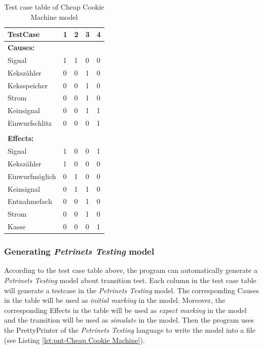 \begin{table}[]
    \centering
    \caption{Test case table of Cheap Cookie Machine model}
    \label{tab:test-case-table}
    \begin{tabular}{|p{3cm}|p{.5cm}<{\centering}|p{.5cm}<{\centering}|p{.5cm}<{\centering}|p{.5cm}<{\centering}|}
        \hline
        \rowcolor{gray} 
        \textbf{TestCase}   & 1  & 2  & 3  & 4  \\ \hline
        \multicolumn{5}{|l|}{\textbf{Causes:}}  \\ \hline
        Signal              & 1  & 1  & 0  & 0  \\ \hline
        Kekszähler          & 0  & 0  & 1  & 0  \\ \hline
        Keksspeicher        & 0  & 0  & 1  & 0  \\ \hline
        Strom               & 0  & 0  & 1  & 0  \\ \hline
        Keinsignal          & 0  & 0  & 1  & 1  \\ \hline
        Einwurfschlitz      & 0  & 0  & 0  & 1  \\ \hline
        \multicolumn{5}{|l|}{}                  \\ \hline
        \multicolumn{5}{|l|}{\textbf{Effects:}} \\ \hline
        Signal              & 1  & 0  & 0  & 1  \\ \hline
        Kekszähler          & 1  & 0  & 0  & 0  \\ \hline
        Einwurfmöglich      & 0  & 1  & 0  & 0  \\ \hline
        Keinsignal          & 0  & 1  & 1  & 0  \\ \hline
        Entnahmefach        & 0  & 0  & 1  & 0  \\ \hline
        Strom               & 0  & 0  & 1  & 0  \\ \hline
        Kasse               & 0  & 0  & 0  & 1  \\ \hline
    \end{tabular}
\end{table}

\subsubsection{Generating \emph{Petrinets Testing} model}
According to the test case table above, the program can automatically generate a \emph{Petrinets Testing} model about transition test. Each column in the test case table will generate a testcase in the \emph{Petrinets Testing} model. The corresponding Causes in the table will be used as \emph{initial marking} in the model. Moreover, the corresponding Effects in the table will be used as \emph{expect marking} in the model and the transition will be used as \emph{simulate} in the model. Then the program uses the PrettyPrinter of the \emph{Petrinets Testing} language to write the model into a file (see Listing \ref{lst:pnt-Cheap Cookie Machine}).

